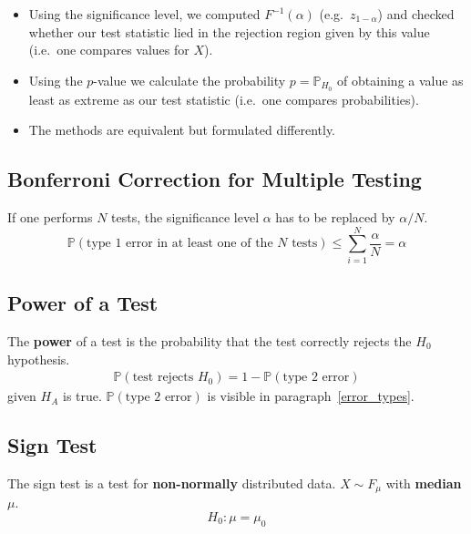 \newpar{}

\begin{itemize}
    \item Using the significance level, we computed $F^{-1}(\alpha)$ (e.g.\ $z_{1-\alpha}$) and checked whether our test statistic lied in the rejection region given by this value (i.e.\ one compares values for $X$).
    \item Using the $p$-value we calculate the probability $p=\mathbb{P}_{H_0}$ of obtaining a value as least as extreme as our test statistic (i.e.\ one compares probabilities).
    \item The methods are equivalent but formulated differently.
\end{itemize}


\subsection{Bonferroni Correction for Multiple Testing}\label{bonferroni_correction}
If one performs $N$ tests, the significance level $\alpha$ has to be replaced by $\alpha/N$.
\begin{equation*}
    \mathbb{P}(\text{type 1 error in at least one of the }N\text{ tests}) \leq \sum_{i=1}^{N}\frac{\alpha}{N}=\alpha
\end{equation*}

\subsection{Power of a Test}
The \textbf{power} of a test is the probability that the test correctly rejects the $H_0$ hypothesis.
\begin{gather*}
    \mathbb{P}(\text{test rejects }H_0) = 1-\mathbb{P}(\text{type 2 error})
\end{gather*}
given $H_A$ is true. $\mathbb{P}(\text{type 2 error})$ is visible in paragraph~\ref{error_types}.

\subsection{Sign Test}
The sign test is a test for \textbf{non-normally} distributed data.
\newpar{}
$X \sim F_\mu$ with \textbf{median} $\mu$.
\newpar{}
\begin{equation*}
    H_0:\mu = \mu_0
\end{equation*}
\newpar{}

